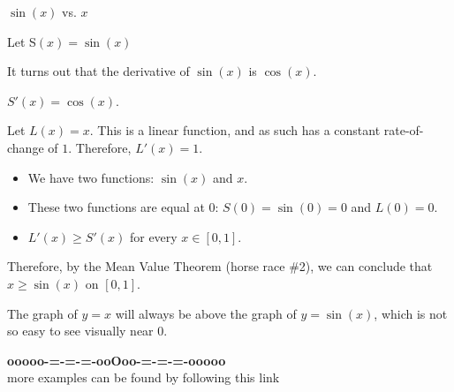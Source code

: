 \documentclass{ximera}
\begin{document}
\begin{example} $\sin(x)$ vs. $x$


Let S$(x) = \sin(x)$

It turns out that the derivative of $\sin(x)$ is $\cos(x)$.

$S'(x) = \cos(x)$.

Let $L(x) = x$.  This is a linear function, and as such has a constant rate-of-change of $1$.  Therefore, $L'(x) = 1$. 


\begin{itemize}
\item We have two functions: $\sin(x)$ and $x$. 
\item These two functions are equal at $0$: $S(0) = \sin(0) = 0$ and $L(0) = 0$.
\item $L'(x) \geq S'(x)$ for every $x \in [0,1]$.
\end{itemize}




Therefore, by the Mean Value Theorem (horse race \#2), we can conclude that $x \geq \sin(x)$ on $[0,1]$.

The graph of $y = x$ will always be above the graph of $y = \sin(x)$, which is not so easy to see visually near $0$.





\begin{center}
\end{center}







\end{example}




































\begin{center}
\textbf{\textcolor{green!50!black}{ooooo-=-=-=-ooOoo-=-=-=-ooooo}} \\

more examples can be found by following this link\\ 

\end{center}
\end{document}
